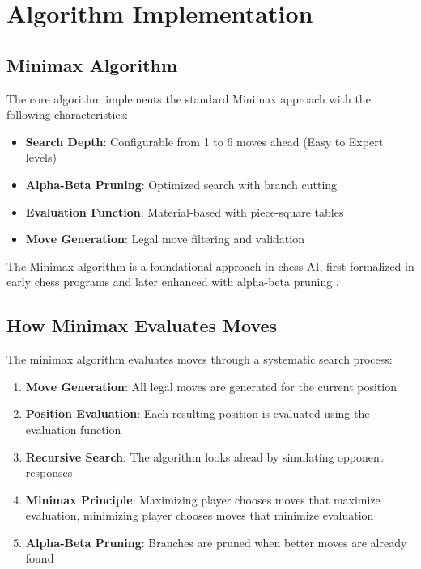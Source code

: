 \documentclass[11pt,a4paper]{report}
\begin{document}
\section{Algorithm Implementation}

\subsection{Minimax Algorithm}
The core algorithm implements the standard Minimax approach with the following characteristics:

\begin{itemize}
    \item \textbf{Search Depth}: Configurable from 1 to 6 moves ahead (Easy to Expert levels)
    \item \textbf{Alpha-Beta Pruning}: Optimized search with branch cutting
    \item \textbf{Evaluation Function}: Material-based with piece-square tables
    \item \textbf{Move Generation}: Legal move filtering and validation
\end{itemize}

The Minimax algorithm is a foundational approach in chess AI, first formalized in early chess programs and later enhanced with alpha-beta pruning \cite{minimax_chess, alpha_beta, minimax_alpha_beta}.

\subsection{How Minimax Evaluates Moves}
The minimax algorithm evaluates moves through a systematic search process:

\begin{enumerate}
    \item \textbf{Move Generation}: All legal moves are generated for the current position
    \item \textbf{Position Evaluation}: Each resulting position is evaluated using the evaluation function
    \item \textbf{Recursive Search}: The algorithm looks ahead by simulating opponent responses
    \item \textbf{Minimax Principle}: Maximizing player chooses moves that maximize evaluation, minimizing player chooses moves that minimize evaluation
    \item \textbf{Alpha-Beta Pruning}: Branches are pruned when better moves are already found
\end{enumerate}
\end{document}
